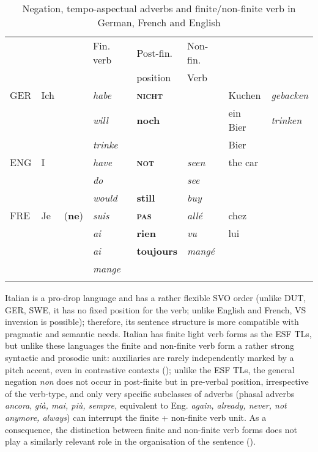 \documentclass[output=paper]{langscibook}
\begin{document}
\begin{table}
\begin{tabular}{llllllll} 
\lsptoprule
    &  &  & Fin. verb & Post-fin. & \multicolumn{1}{l}{Non-fin.} & & \\
    &  &  &           & position  & Verb\\\midrule
GER & Ich &  & {\itshape habe}  & {\bfseries\scshape nicht} &  & Kuchen & {\itshape gebacken} \\
    &     &  & {\itshape will}  & {\bfseries noch}          &  & ein Bier & {\itshape trinken}\\
    &     &  & {\itshape trinke} &                          &  & Bier & \\\addlinespace
ENG & I &  & {\itshape have}    & {\bfseries\scshape not} & {\itshape seen} & the car\\
    &   &  &  \textit{do}       &                         & \textit{see}  & \\
    &   &  & {\itshape would} & {\bfseries still} & \textit{buy}  &  & \\\addlinespace
FRE & Je & (\textbf{ne}) & {\itshape suis} & {\bfseries\scshape pas} & {\itshape allé} & chez  \\
    &    &               & {\itshape ai} & {\bfseries rien} & \textit{vu} & lui & \\
    &    &               & {\itshape ai} & {\bfseries toujours} & {\itshape mangé} \\
    &    &               & {\itshape mange}   &  & \\
\lspbottomrule
\end{tabular}
\caption{\label{tab:benazzo:6}Negation, tempo-aspectual adverbs and finite/non-finite verb in German, French and English}
\end{table}

Italian is a pro-drop language and has a rather flexible SVO order (unlike DUT, GER, SWE, it has no fixed position for the verb; unlike English and French, VS inversion is possible); therefore, its sentence structure is more compatible with pragmatic and semantic needs. Italian has finite light verb forms as the ESF TLs, but unlike these languages the finite and non-finite verb form a rather strong syntactic and prosodic unit: auxiliaries are rarely independently marked by a pitch accent, even in contrastive contexts (\citealt{TurcoEtAl2013,TurcoEtAl2015, AndornoCrocco2018}); unlike the ESF TLs, the general negation \textit{non} does not occur in post-finite but in pre-verbal position, irrespective of the verb-type, and only very specific subclasses of adverbs (phasal adverbs \textit{ancora}, \textit{già, mai, più, sempre,} equivalent to Eng. \textit{again, already, never, not anymore, always}) can interrupt the finite + non-finite verb unit. As a consequence, the distinction between finite and non-finite verb forms does not play a similarly relevant role in the organisation of the sentence ().
\end{document}
